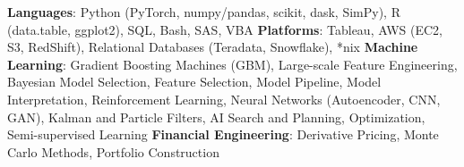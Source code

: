 

\begin{cvparagraph}
{\textbf{Languages}: Python (PyTorch, numpy/pandas, scikit, dask, SimPy), R (data.table, ggplot2), SQL, Bash, SAS, VBA}\newline
{\textbf{Platforms}: Tableau, AWS (EC2, S3, RedShift), Relational Databases (Teradata, Snowflake), *nix}\newline
{\textbf{Machine Learning}: Gradient Boosting Machines (GBM), Large-scale Feature Engineering, Bayesian Model Selection, Feature Selection, Model Pipeline, Model Interpretation, Reinforcement Learning, Neural Networks (Autoencoder, CNN, GAN), Kalman and Particle Filters, AI Search and Planning, Optimization, Semi-supervised Learning}\newline
{\textbf{Financial Engineering}: Derivative Pricing, Monte Carlo Methods, Portfolio Construction}
\end{cvparagraph}

